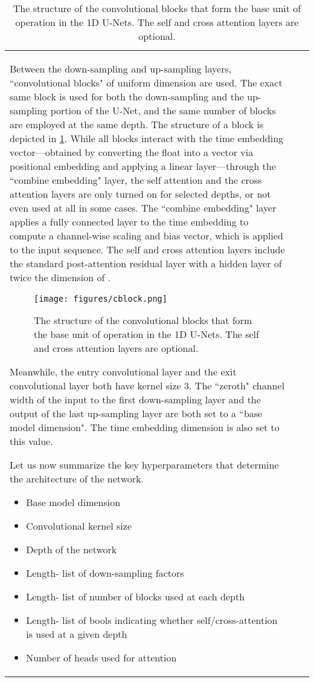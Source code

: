 \documentclass[nohyperref]{article}
\theoremstyle{plain}
\theoremstyle{definition}
\theoremstyle{remark}
\begin{document}
\begin{table}[t!]
{\begin{tabular}{lrr}
Between the down-sampling and up-sampling layers, ``convolutional blocks" of uniform dimension are used. The exact same block is used for both the down-sampling and the up-sampling portion of the U-Net, and the same number of blocks are employed at the same depth. The structure of a block is depicted in \cref{figure:cblock}. While all blocks interact with the time embedding vector---obtained by converting the float into a vector via positional embedding and applying a linear layer---through the ``combine embedding" layer, the self attention and the cross attention layers are only turned on for selected depths, or not even used at all in some cases. The ``combine embedding" layer applies a fully connected layer to the time embedding to compute a channel-wise scaling and bias vector, which is applied to the input sequence. The self and cross attention layers include the standard post-attention residual layer with a hidden layer of twice the dimension of .

\begin{figure}[h!]
\begin{center}
\centerline{
\texttt{[image: figures/cblock.png]}}
\caption{The structure of the convolutional blocks that form the base unit of operation in the 1D U-Nets. The self and cross attention layers are optional.}
\label{figure:cblock}
\end{center}
\vskip -0.2in
\end{figure}

Meanwhile, the entry convolutional layer and the exit convolutional layer both have kernel size 3. The ``zeroth" channel width of the input to the first down-sampling layer and the output of the last up-sampling layer are both set to a ``base model dimension". The time embedding dimension is also set to this value.

Let us now summarize the key hyperparameters that determine the architecture of the network.
\begin{itemize}
\item Base model dimension
\item Convolutional kernel size
\item Depth of the network 
\item Length- list of down-sampling factors
\item Length- list of number of blocks used at each depth
\item Length- list of bools indicating whether self/cross-attention is used at a given depth
\item Number of heads used for attention
\end{itemize}


\end{tabular}}
\end{table}
\end{document}
